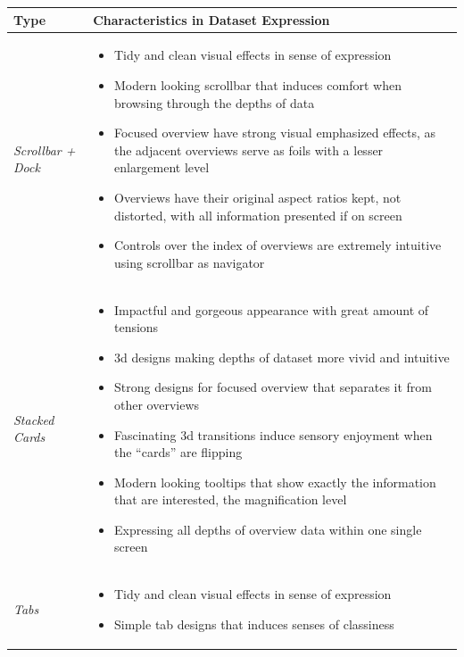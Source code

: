\begingroup
\centering
\begin{tabu} to .97\textwidth { | X[1, r, m] | X[3, l, m] | }
    \hline
    Type & Characteristics in Dataset Expression \\
    \hline\hline
    \emph{Scrollbar + Dock} &
    \vspace{.85em}\begin{itemize}
        \item Tidy and clean visual effects in sense of expression
        \item Modern looking scrollbar that induces comfort when browsing through the depths of data
        \item Focused overview have strong visual emphasized effects, as the adjacent overviews serve as foils with a lesser enlargement level
        \item Overviews have their original aspect ratios kept, not distorted, with all information presented if on screen
        \item Controls over the index of overviews are extremely intuitive using scrollbar as navigator
    \end{itemize} \\
    \hline
    \emph{Stacked Cards} &
    \vspace{.85em}\begin{itemize}
        \item Impactful and gorgeous appearance with great amount of tensions
        \item 3d designs making depths of dataset more vivid and intuitive
        \item Strong designs for focused overview that separates it from other overviews
        \item Fascinating 3d transitions induce sensory enjoyment when the ``cards'' are flipping
        \item Modern looking tooltips that show exactly the information that are interested, the magnification level
        \item Expressing all depths of overview data within one single screen
    \end{itemize} \\
    \hline
    \emph{Tabs} &
    \vspace{.85em}\begin{itemize}
        \item Tidy and clean visual effects in sense of expression
        \item Simple tab designs that induces senses of classiness

\end{itemize}
\end{tabu}
